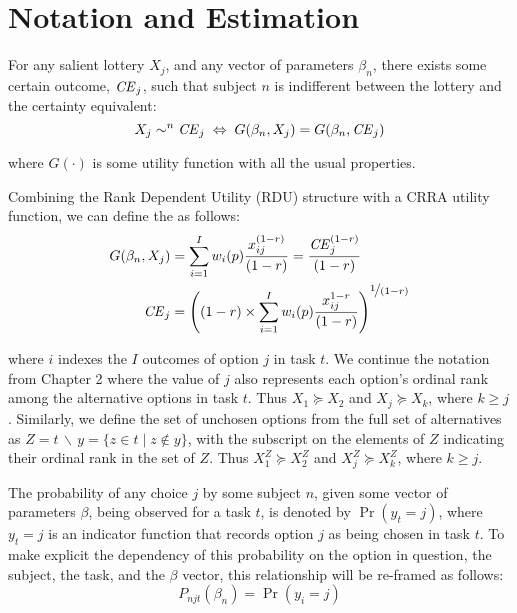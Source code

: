 \documentclass[../main.tex]{subfiles}
\begin{document}
\section{Notation and Estimation} \label{ssec:Notation}

For any salient lottery $X_j$, and any vector of parameters $\beta_n$, there exists some certain outcome, $\mathit{CE}_j$, such that subject $n$ is indifferent between the lottery and the certainty equivalent:
\begin{equation}
	\label{eq3:CE.indiff}
	X_j \sim^n {\mathit{CE}}_j \;\Leftrightarrow\; G(\beta_n,X_j) = G(\beta_n, {\mathit{CE}}_j)
\end{equation}

\noindent where $G(\cdot)$ is some utility function with all the usual properties.

Combining the Rank Dependent Utility (RDU) structure with a CRRA utility function, we can define the {\CE} as follows:
\begin{align}
	\label{eq3:CEcalc}
	\begin{split}
		G(\beta_n,X_j) &= \sum_{i=1}^{I} w_i(p) \frac{x_{ij}^{(1-r)}}{(1-r)} = \frac{ {\mathit{CE}}_j^{(1-r)}}{(1-r)}\\
		{\mathit{CE}}_j &=  \left( (1-r) \times \sum_{i=1}^{I} w_i(p) \frac{x_{ij}^{1-r}}{(1-r)} \right)^{ \displaystyle\nicefrac{1}{(1-r)} }
	\end{split}
\end{align}

\noindent where $i$ indexes the $I$ outcomes of option $j$ in task $t$. 
We continue the notation from Chapter 2 where the value of $j$ also represents each option's ordinal rank among the alternative options in task $t$.
Thus $X_1 \succcurlyeq X_2$ and $X_j \succcurlyeq X_k$, where $k \geq j$.
Similarly, we define the set of unchosen options from the full set of alternatives as $Z = t \,\backslash\, y = \{z \in t \;|\; z \notin y \}$, with the subscript on the elements of $Z$ indicating their ordinal rank in the set of $Z$.
Thus $X_1^Z \succcurlyeq X_2^Z$ and $X_j^Z \succcurlyeq X_k^Z$, where $k \geq j$.

The probability of any choice $j$ by some subject $n$, given some vector of parameters $\beta$, being observed for a task $t$, is denoted by $\Pr( y_t = j)$, where $y_t = j$ is an indicator function that records option $j$ as being chosen in task $t$.
To make explicit the dependency of this probability on the option in question, the subject, the task, and the $\beta$ vector, this relationship will be re-framed as follows:
\begin{equation}
	\label{eq3:Pnjt}
	P_{njt}(\beta_n) = \Pr(y_i = j)
\end{equation}
\end{document}
